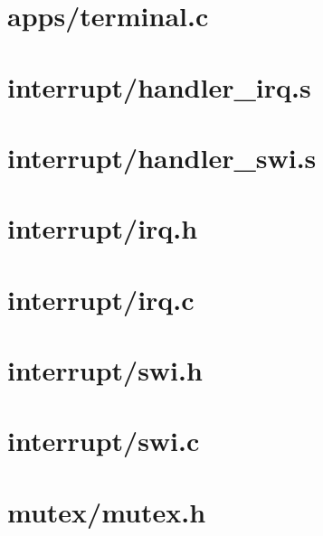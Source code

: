 \section{apps/terminal.c} \label{sec:terminal.c}



\section{interrupt/handler\_irq.s} \label{sec:handlerirq.s}


\section{interrupt/handler\_swi.s} \label{sec:handlerswi.s}


\section{interrupt/irq.h} \label{sec:irq.h}


\section{interrupt/irq.c} \label{sec:irq.c}


\section{interrupt/swi.h} \label{sec:swi.h}


\section{interrupt/swi.c} \label{sec:swi.c}



\section{mutex/mutex.h} \label{sec:mutex.h}


